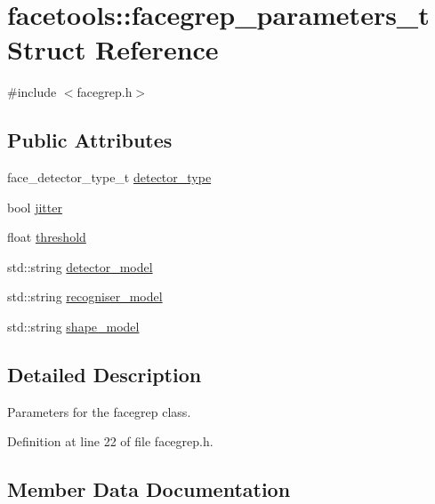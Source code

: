 \hypertarget{structfacetools_1_1facegrep__parameters__t}{}\section{facetools\+:\+:facegrep\+\_\+parameters\+\_\+t Struct Reference}
\label{structfacetools_1_1facegrep__parameters__t}


{\ttfamily \#include $<$facegrep.\+h$>$}

\subsection*{Public Attributes}
\begin{DoxyCompactItemize}
\item 
face\+\_\+detector\+\_\+type\+\_\+t \hyperlink{structfacetools_1_1facegrep__parameters__t_abba46f8b5beab015833874527d207d25}{detector\+\_\+type}
\item 
bool \hyperlink{structfacetools_1_1facegrep__parameters__t_a8027e4ec22546d3677c89dfa1f0811e4}{jitter}
\item 
float \hyperlink{structfacetools_1_1facegrep__parameters__t_aebb328a0601c2d3b3361ea9f25a775b0}{threshold}
\item 
std\+::string \hyperlink{structfacetools_1_1facegrep__parameters__t_ae0f9245332cf5039caccb0da14da819a}{detector\+\_\+model}
\item 
std\+::string \hyperlink{structfacetools_1_1facegrep__parameters__t_a1375ef2f7de876c38ae3fe42be232941}{recogniser\+\_\+model}
\item 
std\+::string \hyperlink{structfacetools_1_1facegrep__parameters__t_ad568674483df43373dde53e1373cd8f7}{shape\+\_\+model}
\end{DoxyCompactItemize}


\subsection{Detailed Description}
Parameters for the facegrep class. 

Definition at line 22 of file facegrep.\+h.



\subsection{Member Data Documentation}
